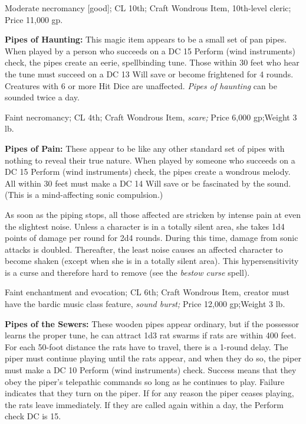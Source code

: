 Moderate necromancy [good]; CL 10th; Craft Wondrous Item, 10th-level cleric; Price 
11,000 gp.

\textbf{Pipes of Haunting: }This magic item appears to be a small set of pan pipes. 
When played by a person who succeeds on a DC 15 Perform (wind instruments) check, 
the pipes create an eerie, spellbinding tune. Those within 30 feet who hear the 
tune must succeed on a DC 13 Will save or become frightened for 4 rounds. Creatures 
with 6 or more Hit Dice are unaffected. \textit{Pipes of haunting }can be sounded 
twice a day.

Faint necromancy; CL 4th; Craft Wondrous Item, \textit{scare; }Price 6,000 gp;Weight 
3 lb.

\textbf{Pipes of Pain:} These appear to be like any other standard set of pipes 
with nothing to reveal their true nature. When played by someone who succeeds on 
a DC 15 Perform (wind instruments) check, the pipes create a wondrous melody. All 
within 30 feet must make a DC 14 Will save or be fascinated by the sound. (This 
is a mind-affecting sonic compulsion.)

As soon as the piping stops, all those affected are stricken by intense pain at 
even the slightest noise. Unless a character is in a totally silent area, she takes 
1d4 points of damage per round for 2d4 rounds. During this time, damage from sonic 
attacks is doubled. Thereafter, the least noise causes an affected character to 
become shaken (except when she is in a totally silent area). This hypersensitivity 
is a curse and therefore hard to remove (see the \textit{bestow curse }spell).

Faint enchantment and evocation; CL 6th; Craft Wondrous Item, creator must have 
the bardic music class feature, \textit{sound burst; }Price 12,000 gp;Weight 3 
lb.

\textbf{Pipes of the Sewers:} These wooden pipes appear ordinary, but if the possessor 
learns the proper tune, he can attract 1d3 rat swarms if rats are within 400 feet. 
For each 50-foot distance the rats have to travel, there is a 1-round delay. The 
piper must continue playing until the rats appear, and when they do so, the piper 
must make a DC 10 Perform (wind instruments) check. Success means that they obey 
the piper's telepathic commands so long as he continues to play. Failure indicates 
that they turn on the piper. If for any reason the piper ceases playing, the rats 
leave immediately. If they are called again within a day, the Perform check DC 
is 15.

